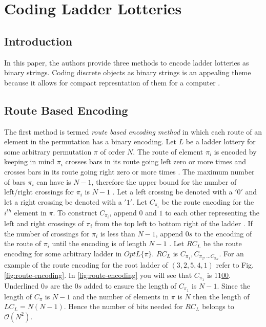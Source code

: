 \section{Coding Ladder Lotteries}
\subsection{Introduction}
In this paper, the authors provide three methods to encode ladder lotteries as 
binary strings. Coding discrete objects as binary strings is an appealing theme because 
it allows for compact represntation of them for a computer \cite{A5}.
\subsection{Route Based Encoding}
The first method is termed \emph{route based encoding method} in 
which each route of an element in the permutation has a binary encoding. Let $L$
be a ladder lottery for some arbitrary permutation $\pi$ of order $N$. The route 
of element $\pi_{i}$ is encoded by keeping in mind $\pi_{i}$ crosses bars in its route 
going left zero or more times and crosses bars in its route going right zero or 
more times \cite{A5}. The maximum number of bars $\pi_{i}$ can have is $N-1$, therefore the 
upper bound for the number of left/right crossings for $\pi_{i}$ is $N-1$ \cite{A5}. 
Let a left crossing be denoted with a $'0'$ and let a right crossing be denoted 
with a $'1'$. Let $C_{\pi_{i}}$ be the route encoding for the $i^{th}$ element 
in $\pi$. To construct $C_{\pi_{i}}$,  append $0$ and $1$ to each other representing 
the left and right crossings of $\pi_{i}$ from the top left 
to bottom right of the ladder \cite{A5}. If the number of crossings for $\pi_{i}$ 
is less than $N-1$, append $0s$ to the encoding of the route of $\pi_{i}$ until
the encoding is of length $N-1$ \cite{A5}. Let $RC_{L}$ be the route encoding for 
some arbitrary ladder in $OptL\{\pi\}$. $RC_{L}$ is $C_{\pi_{1}}, C_{\pi_{2}, \dots C_{\pi_{N}}}$.
For an example of the route encoding for the root ladder of $(3,2,5,4,1)$ refer to 
Fig.\ref{fig:route-encoding}. In \ref{fig:route-encoding} you will see that $C_{\pi_{1}}$ is 11\underline{00}. Underlined 
$0s$ are the $0s$ added to ensure the length of $C_{\pi_{1}}$ is $N-1$.
Since the length of $C_{\pi}$ is $N-1$ and the number of elements in $\pi$ is $N$
then the length of $LC_{L}=N(N-1)$. Hence the number of bits needed for $RC_{L}$ 
belongs to $\mathcal{O}(N^{2})$.\par 
